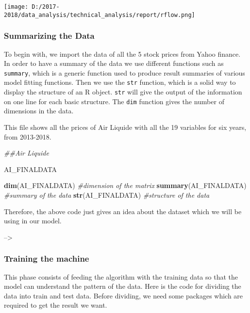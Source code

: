 \documentclass[
  11pt,
]{article}
\newenvironment{Shaded}{\begin{snugshade}}{\end{snugshade}}
\newcommand{\CommentTok}[1]{\textcolor[rgb]{0.56,0.35,0.01}{\textit{#1}}}
\newcommand{\KeywordTok}[1]{\textcolor[rgb]{0.13,0.29,0.53}{\textbf{#1}}}
\newcommand{\NormalTok}[1]{#1}
\let\origfigure\figure
\let\endorigfigure\endfigure
\renewenvironment{figure}[1][2] {
    \expandafter\origfigure\expandafter[H]
} {
    \endorigfigure
}
\begin{document}
\begin{figure}
\centering
\texttt{[image: D:/2017-2018/data\_analysis/technical\_analysis/report/rflow.png]}
\caption{Flow chart of the process}
\end{figure}

\hypertarget{summarizing-the-data}{%
\subsubsection{Summarizing the Data}\label{summarizing-the-data}}

To begin with, we import the data of all the 5 stock prices from Yahoo
finance. In order to have a summary of the data we use different
functions such as \texttt{summary}, which is a generic function used to
produce result summaries of various model fitting functions. Then we use
the \texttt{str} function, which is a solid way to display the structure
of an R object. \texttt{str} will give the output of the information on
one line for each basic structure. The \texttt{dim} function gives the
number of dimensions in the data.

This file shows all the prices of Air Liquide with all the 19 variables
for six years, from 2013-2018.

\begin{Shaded}
\begin{Highlighting}[]
\CommentTok{##Air Liquide}

\NormalTok{AI_FINALDATA}

\KeywordTok{dim}\NormalTok{(AI_FINALDATA)    }\CommentTok{#dimension of the matrix}
\KeywordTok{summary}\NormalTok{(AI_FINALDATA)  }\CommentTok{#summary of the data}
\KeywordTok{str}\NormalTok{(AI_FINALDATA)  }\CommentTok{#structure of the data}
\end{Highlighting}
\end{Shaded}

Therefore, the above code just gives an idea about the dataset which we
will be using in our model.

--\textgreater{}

\hypertarget{training-the-machine}{%
\subsubsection{Training the machine}\label{training-the-machine}}

This phase consists of feeding the algorithm with the training data so
that the model can understand the pattern of the data. Here is the code
for dividing the data into train and test data. Before dividing, we need
some packages which are required to get the result we want.
\end{document}
